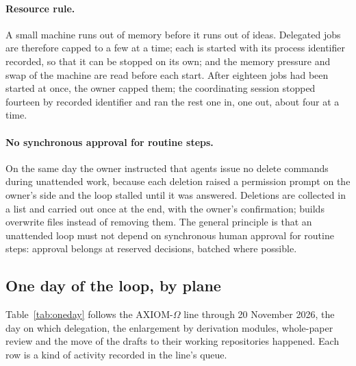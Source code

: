 \documentclass[11pt]{article}
\begin{document}
\paragraph{Resource rule.} A small machine runs out of memory before it runs
out of ideas. Delegated jobs are therefore capped to a few at a time; each is
started with its process identifier recorded, so that it can be stopped on
its own; and the memory pressure and swap of the machine are read before each
start. After eighteen jobs had been started at once, the owner capped them;
the coordinating session stopped fourteen by recorded identifier and ran the
rest one in, one out, about four at a time.

\paragraph{No synchronous approval for routine steps.} On the same day the
owner instructed that agents issue no delete commands during unattended work,
because each deletion raised a permission prompt on the owner's side and the
loop stalled until it was answered. Deletions are collected in a list and
carried out once at the end, with the owner's confirmation; builds overwrite files instead of
removing them. The general principle is that an unattended loop must not
depend on synchronous human approval for routine steps: approval belongs at
reserved decisions, batched where possible.

\subsection{One day of the loop, by plane}
\label{sec:oneday}
Table~\ref{tab:oneday} follows the AXIOM-$\Omega$ line through 20 November
2026, the day on which delegation, the enlargement by derivation modules,
whole-paper review and the move of the drafts to their working repositories
happened. Each row is a kind of activity recorded in the line's queue.
\end{document}
